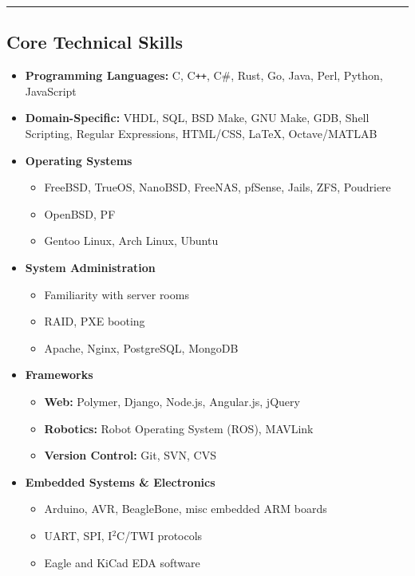 \documentclass[10pt,letterpaper]{article}
\begin{document}
\vspace{2pt}
\hrule
\vspace{-0.4em}
\subsection*{Core Technical Skills}
\begin{itemize}
    \item \textbf{Programming Languages:} C, C\texttt{++}, C\#, Rust, Go, Java,
            Perl, Python, JavaScript
    \item \textbf{Domain-Specific:} VHDL, SQL, BSD Make, GNU Make, GDB, Shell
            Scripting, Regular Expressions, HTML/CSS, \LaTeX, Octave/MATLAB
    \item \textbf{Operating Systems}
        \begin{itemize}
            \item FreeBSD, TrueOS, NanoBSD, FreeNAS, pfSense, Jails, ZFS, Poudriere
            \item OpenBSD, PF
            \item Gentoo Linux, Arch Linux, Ubuntu
        \end{itemize}
    \item \textbf{System Administration}
        \begin{itemize}
            \item Familiarity with server rooms
            \item RAID, PXE booting
            \item Apache, Nginx, PostgreSQL, MongoDB
        \end{itemize}
    \item \textbf{Frameworks}
        \begin{itemize}
            \item \textbf{Web:} Polymer, Django, Node.js, Angular.js, jQuery
            \item \textbf{Robotics:} Robot Operating System (ROS), MAVLink
            \item \textbf{Version Control:} Git, SVN, CVS
        \end{itemize}
    \item \textbf{Embedded Systems \& Electronics}
        \begin{itemize}
            \item Arduino, AVR, BeagleBone, misc embedded ARM boards
            \item UART, SPI, I$^2$C/TWI protocols
            \item Eagle and KiCad EDA software

\end{itemize}
\end{itemize}
\end{document}
